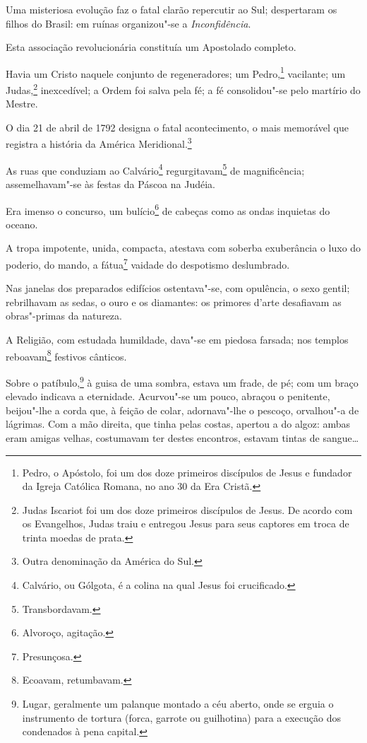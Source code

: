 Uma misteriosa evolução faz o fatal clarão repercutir ao Sul;
despertaram os filhos do Brasil: em ruínas organizou"-se a
\emph{Inconfidência}.

Esta associação revolucionária constituía um Apostolado completo.

Havia um Cristo naquele conjunto de regeneradores; um Pedro,\footnote{
  Pedro, o Apóstolo, foi um dos doze primeiros discípulos de Jesus e
  fundador da Igreja Católica Romana, no ano 30 da Era Cristã.}
vacilante; um Judas,\footnote{Judas Iscariot foi um dos doze primeiros
  discípulos de Jesus. De acordo com os Evangelhos, Judas traiu e
  entregou Jesus para seus captores em troca de trinta moedas de prata.}
inexcedível; a Ordem foi salva pela fé; a fé consolidou"-se pelo martírio
do Mestre.

O dia 21 de abril de 1792 designa o fatal acontecimento, o mais
memorável que registra a história da América Meridional.\footnote{
  Outra denominação da América do Sul.}

As ruas que conduziam ao Calvário\footnote{Calvário, ou Gólgota, é a
  colina na qual Jesus foi crucificado.} regurgitavam\footnote{
  Transbordavam.} de magnificência; assemelhavam"-se às festas da Páscoa
na Judéia.

Era imenso o concurso, um bulício\footnote{Alvoroço, agitação.} de
cabeças como as ondas inquietas do oceano.

A tropa impotente, unida, compacta, atestava com soberba exuberância o
luxo do poderio, do mando, a fátua\footnote{Presunçosa.} vaidade do
despotismo deslumbrado.

Nas janelas dos preparados edifícios ostentava"-se, com opulência, o sexo
gentil; rebrilhavam as sedas, o ouro e os diamantes: os primores d'arte
desafiavam as obras"-primas da natureza.

A Religião, com estudada humildade, dava"-se em piedosa farsada; nos
templos reboavam\footnote{Ecoavam, retumbavam.} festivos cânticos.

Sobre o patíbulo,\footnote{Lugar, geralmente um palanque montado a céu
  aberto, onde se erguia o instrumento de tortura (forca, garrote ou
  guilhotina) para a execução dos condenados à pena capital.} à guisa
de uma sombra, estava um frade, de pé; com um braço elevado indicava a
eternidade. Acurvou"-se um pouco, abraçou o penitente, beijou"-lhe a corda
que, à feição de colar, adornava"-lhe o pescoço, orvalhou"-a de lágrimas.
Com a mão direita, que tinha pelas costas, apertou a do algoz: ambas
eram amigas velhas, costumavam ter destes encontros, estavam tintas de
sangue\ldots{}

